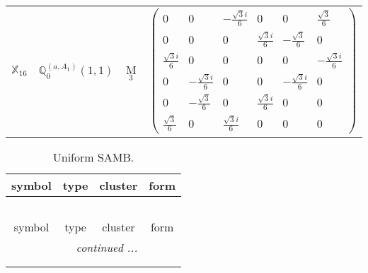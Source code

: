 \documentclass[fleqn,10pt,landscape]{article}
\begin{document}
\begin{itemize}
\begin{center}
\begin{longtable}{c|c|c|c}
$ \mathbb{X}_{16} $ & $\mathbb{Q}_{0}^{(a,A_{1})}(1,1)$ & M$_{3}$ & $\begin{pmatrix} 0 & 0 & - \frac{\sqrt{3} i}{6} & 0 & 0 & \frac{\sqrt{3}}{6} \\ 0 & 0 & 0 & \frac{\sqrt{3} i}{6} & - \frac{\sqrt{3}}{6} & 0 \\ \frac{\sqrt{3} i}{6} & 0 & 0 & 0 & 0 & - \frac{\sqrt{3} i}{6} \\ 0 & - \frac{\sqrt{3} i}{6} & 0 & 0 & - \frac{\sqrt{3} i}{6} & 0 \\ 0 & - \frac{\sqrt{3}}{6} & 0 & \frac{\sqrt{3} i}{6} & 0 & 0 \\ \frac{\sqrt{3}}{6} & 0 & \frac{\sqrt{3} i}{6} & 0 & 0 & 0 \end{pmatrix}$ \\
\end{longtable}
\end{center}
\begin{center}
\renewcommand{\arraystretch}{1.3}
\begin{longtable}{c|c|c|c}
\caption{Uniform SAMB.}
 \\
 \hline \hline
symbol & type & cluster & form \\ \hline \endfirsthead

\multicolumn{3}{l}{\tablename\ \thetable{}} \\
 \hline \hline
symbol & type & cluster & form \\ \hline \endhead

 \hline \hline
\multicolumn{3}{r}{\footnotesize\it continued ...} \\ \endfoot

 \hline \hline
\multicolumn{3}{r}{} \\ \endlastfoot


\end{longtable}
\end{center}
\end{itemize}
\end{document}

